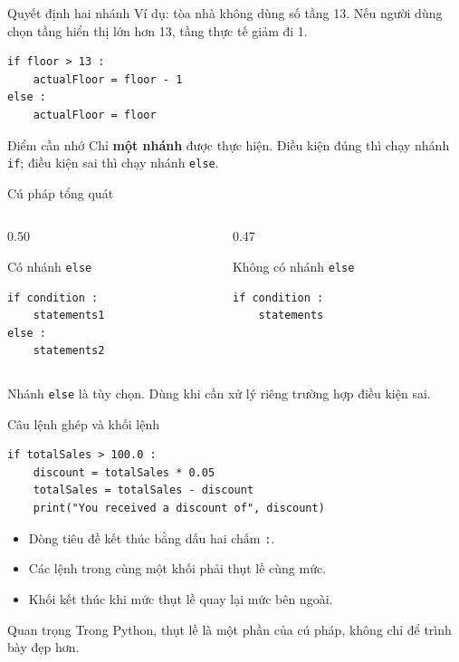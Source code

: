 \documentclass[aspectratio=169,11pt]{beamer}
\newcommand{\code}[1]{\texttt{#1}}
\newcommand{\smallgap}{\vspace{0.4em}}
\begin{document}
\begin{frame}[fragile]{Quyết định hai nhánh}
Ví dụ: tòa nhà không dùng số tầng 13. Nếu người dùng chọn tầng hiển thị lớn hơn 13, tầng thực tế giảm đi 1.
\smallgap
\begin{lstlisting}[style=py]
if floor > 13 :
    actualFloor = floor - 1
else :
    actualFloor = floor
\end{lstlisting}
\smallgap
\begin{block}{Điểm cần nhớ}
Chỉ \textbf{một nhánh} được thực hiện. Điều kiện đúng thì chạy nhánh \code{if}; điều kiện sai thì chạy nhánh \code{else}.
\end{block}
\end{frame}

\begin{frame}[fragile]{Cú pháp tổng quát}
\begin{columns}[T]
\begin{column}{0.50\textwidth}
\begin{block}{Có nhánh \code{else}}
\begin{lstlisting}[style=py]
if condition :
    statements1
else :
    statements2
\end{lstlisting}
\end{block}
\end{column}
\begin{column}{0.47\textwidth}
\begin{block}{Không có nhánh \code{else}}
\begin{lstlisting}[style=py]
if condition :
    statements
\end{lstlisting}
\end{block}
\end{column}
\end{columns}
\smallgap
Nhánh \code{else} là tùy chọn. Dùng khi cần xử lý riêng trường hợp điều kiện sai.
\end{frame}

\begin{frame}[fragile]{Câu lệnh ghép và khối lệnh}
\begin{lstlisting}[style=py]
if totalSales > 100.0 :
    discount = totalSales * 0.05
    totalSales = totalSales - discount
    print("You received a discount of", discount)
\end{lstlisting}
\begin{itemize}
  \item Dòng tiêu đề kết thúc bằng dấu hai chấm \code{:}.
  \item Các lệnh trong cùng một khối phải thụt lề cùng mức.
  \item Khối kết thúc khi mức thụt lề quay lại mức bên ngoài.
\end{itemize}
\begin{alertblock}{Quan trọng}
Trong Python, thụt lề là một phần của cú pháp, không chỉ để trình bày đẹp hơn.
\end{alertblock}
\end{frame}
\end{document}
